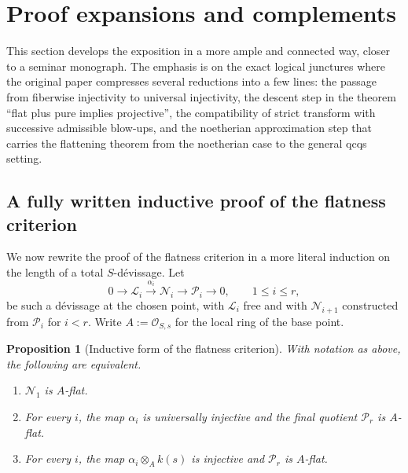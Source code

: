 \documentclass[11pt,oneside]{article}
\newtheorem{proposition}[theorem]{Proposition}
\newcommand{\Lcal}{\mathcal L}
\newcommand{\N}{\mathcal N}
\newcommand{\Pcal}{\mathcal P}
\newcommand{\OO}{\mathcal O}
\begin{document}
\section{Proof expansions and complements}

This section develops the exposition in a more ample and connected way, closer to a seminar monograph.  The emphasis is on the exact logical junctures where the original paper compresses several reductions into a few lines: the passage from fiberwise injectivity to universal injectivity, the descent step in the theorem ``flat plus pure implies projective'', the compatibility of strict transform with successive admissible blow-ups, and the noetherian approximation step that carries the flattening theorem from the noetherian case to the general qcqs setting.

\subsection{A fully written inductive proof of the flatness criterion}

We now rewrite the proof of the flatness criterion in a more literal induction on the length of a total $S$-d\'evissage.  Let
\[
0\to \Lcal_i\xrightarrow{\alpha_i}\N_i\to \Pcal_i\to 0,
\qquad 1\le i\le r,
\]
be such a d\'evissage at the chosen point, with $\Lcal_i$ free and with $\N_{i+1}$ constructed from $\Pcal_i$ for $i<r$.  Write $A:=\OO_{S,s}$ for the local ring of the base point.

\begin{proposition}[Inductive form of the flatness criterion]\label{prop:inductive-flatness-criterion}
With notation as above, the following are equivalent.
\begin{enumerate}[label=\textup{(\roman*)}]
  \item $\N_1$ is $A$-flat.
  \item For every $i$, the map $\alpha_i$ is universally injective and the final quotient $\Pcal_r$ is $A$-flat.
  \item For every $i$, the map $\alpha_i\otimes_A k(s)$ is injective and $\Pcal_r$ is $A$-flat.
\end{enumerate}
\end{proposition}
\end{document}
